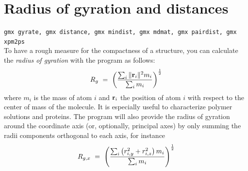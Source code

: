 
\section{Radius of gyration and distances}
\label{sec:rg}
{\tt gmx gyrate, gmx distance, gmx mindist, gmx mdmat, gmx pairdist, gmx xpm2ps}\\
To have a rough measure for the compactness of a structure, you can calculate 
the {\em radius of gyration} with the program {\tt {}} as follows:
\begin{equation}
R_g ~=~ \left({\frac{\sum_i \|{\bf r}_i\|^2 m_i}{\sum_i m_i}}\right)^{\half}
\label{eqn:rg}
\end{equation}
where $m_i$ is the mass of atom $i$ and ${\bf r}_i$ the position of 
atom $i$ with respect to the center of mass of the molecule. It is especially 
useful to characterize polymer solutions and proteins. The program will also
provide the radius of gyration around the coordinate axis (or, optionally, principal axes)
by only summing the radii components orthogonal to each axis, for instance
\begin{equation}
R_{g,x} ~=~ \left({\frac{\sum_i \left( r_{i,y}^2 + r_{i,z}^2 \right) m_i}{\sum_i m_i}}\right)^{\half}
\label{eqn:rgaxis}
\end{equation}


